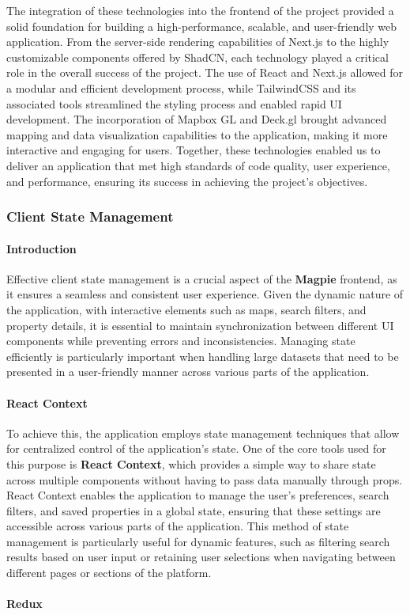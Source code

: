 The integration of these technologies into the frontend of the project provided
a solid foundation for building a high{-}performance, scalable, and
user{-}friendly web application. From the server{-}side rendering capabilities
of Next.js to the highly customizable components offered by ShadCN, each
technology played a critical role in the overall success of the project. The use
of React and Next.js allowed for a modular and efficient development process,
while TailwindCSS and its associated tools streamlined the styling process and
enabled rapid UI development. The incorporation of Mapbox GL and Deck.gl brought
advanced mapping and data visualization capabilities to the application, making
it more interactive and engaging for users. Together, these technologies enabled
us to deliver an application that met high standards of code quality, user
experience, and performance, ensuring its success in achieving the project's
objectives.

\subsubsection{Client State Management}
\paragraph{Introduction}\mbox{}

Effective client state management is a crucial aspect of the \textbf{Magpie}
frontend, as it ensures a seamless and consistent user experience. Given the
dynamic nature of the application, with interactive elements such as maps,
search filters, and property details, it is essential to maintain
synchronization between different UI components while preventing errors and
inconsistencies. Managing state efficiently is particularly important when
handling large datasets that need to be presented in a user{-}friendly
manner across various parts of the application. \paragraph{React
Context}\mbox{}

To achieve this, the application employs state management techniques that
allow for centralized control of the application's state. One of the core
tools used for this purpose is \textbf{React Context}, which provides a
simple way to share state across multiple components without having to pass
data manually through props. React Context enables the application to manage
the user's preferences, search filters, and saved properties in a global
state, ensuring that these settings are accessible across various parts of
the application. This method of state management is particularly useful for
dynamic features, such as filtering search results based on user input or
retaining user selections when navigating between different pages or
sections of the platform. \paragraph{Redux}\mbox{}

